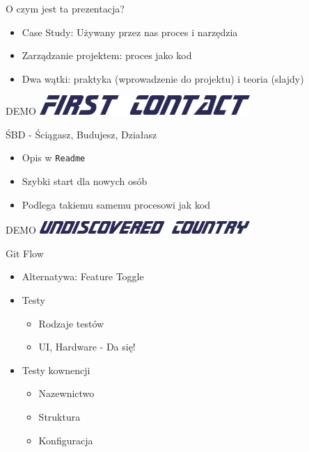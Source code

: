 \documentclass[ignorenonframetext]{beamer}
\begin{document}
\begin{frame}{O czym jest ta prezentacja?}
\begin{itemize}
	\item Case Study: Używany przez nas proces i narzędzia
	\item Zarządzanie projektem: proces jako kod
	\item Dwa wątki: praktyka (wprowadzenie do projektu) i teoria (slajdy)
\end{itemize}
\end{frame}

\begin{frame}{DEMO}
\centering
\includegraphics[width=8cm]{images/first-contact.png}
\end{frame}

\begin{frame}{ŚBD - Ściągasz, Budujesz, Działasz}
\begin{itemize}
	\item Opis w \texttt{Readme}
	\item Szybki start dla nowych osób
	\item Podlega takiemu samemu procesowi jak kod
\end{itemize}
\end{frame}

\begin{frame}{DEMO}
	\centering
	\includegraphics[width=8cm]{images/undiscovered-country.png}
\end{frame}

\begin{frame}{Git Flow}
\begin{itemize}
	\item Alternatywa: Feature Toggle
	\item Testy
	\begin{itemize}
		\item Rodzaje testów
		\item UI, Hardware - Da się! 
	\end{itemize}
	\item Testy kownencji
	\begin{itemize}
		\item Nazewnictwo
		\item Struktura
		\item Konfiguracja
	\end{itemize}
\end{itemize}
\end{frame}
\end{document}
